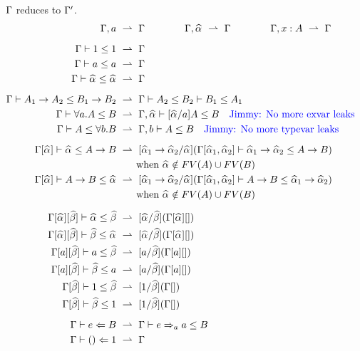 \begin{figure}[t]
 $\Gamma$ reduces to $\Gamma'$.
\begin{gather*}
\begin{aligned}
\Gm, a &\rto \Gm \qquad\qquad
\Gm, \al \rto \Gm \qquad\qquad
\Gm, x:A \rto \Gm
\\[2mm]
\Gm \vdash 1\le 1 &\rto \Gm\\
\Gm \vdash a\le a &\rto \Gm\\
\Gm \vdash \al\le \al &\rto \Gm
\\[2mm]
\Gm \vdash A_1\to A_2 \le B_1\to B_2 &\rto \Gm \vdash A_2 \le B_2 \vdash B_1\le A_1\\
\Gm \vdash \forall a. A\le B &\rto \Gm,\al \vdash [\al/a]A\le B \quad\text{\jimmy{No more exvar leaks}}\\
\Gm \vdash A\le \forall b. B &\rto \Gm,b \vdash A\le B \quad\text{\jimmy{No more typevar leaks}}
\\[2mm]
\Gm[\al] \vdash \al \le A\to B &\rto [\al[1]\to\al[2]/\al] (\Gm[\al[1], \al[2]] \vdash \al[1]\to \al[2] \le A \to B)\\
 &\qquad \text{when }\al\notin FV(A)\cup FV(B)\\
\Gm[\al] \vdash A\to B \le \al &\rto [\al[1]\to \al[2]/\al] (\Gm[\al[1], \al[2]] \vdash A \to B \le \al[1]\to \al[2])\\
 &\qquad \text{when }\al\notin FV(A)\cup FV(B)
 \\[2mm]
\Gm[\al][\bt] \vdash \al \le \bt &\rto [\al/\bt](\Gm[\al][])\\
\Gm[\al][\bt] \vdash \bt \le \al &\rto [\al/\bt](\Gm[\al][])\\
\Gm[a][\bt] \vdash a \le \bt &\rto [a/\bt](\Gm[a][])\\
\Gm[a][\bt] \vdash \bt \le a &\rto [a/\bt](\Gm[a][])\\
\Gm[\bt] \vdash 1 \le \bt &\rto [1/\bt](\Gm[])\\
\Gm[\bt] \vdash \bt \le 1 &\rto [1/\bt](\Gm[])
\\[2mm]
\Gm \vdash e \Lto B &\rto \Gm \vdash e\To_a a\le B\\
\Gm \vdash () \Lto 1 &\rto \Gm\\

\end{aligned}
\end{gather*}
\end{figure}
